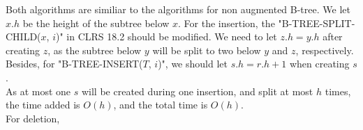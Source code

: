 \documentclass{6046}
\begin{document}
Both algorithms are similiar to 
the algorithms for non augmented B-tree. 
We let $x.h$ be the height of the subtree below $x$. 
For the insertion, 
the "B-TREE-SPLIT-CHILD($x$, $i$)" 
in CLRS 18.2 should be modified.  
We need to let $z.h = y.h$ after creating 
$z$, as the subtree below $y$ 
will be split to two below 
$y$ and $z$, respectively. 
Besides, 
for "B-TREE-INSERT($T$, $i$)", 
we should let $s.h = r.h +1$ when 
creating $s$.  
\\

As at most one $s$ will be created 
during one insertion, 
and split at most $h$ times, 
the time added is $O(h)$, 
and the total time is $O(h)$. 
\\

For deletion, 
\end{document}
